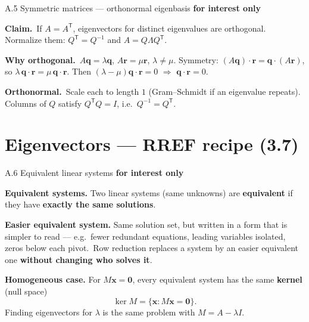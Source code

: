 \documentclass[11pt,aspectratio=169]{beamer}
\newcommand{\InterestOnly}{\textcolor{mAccent}{\textbf{for interest only}}}
\begin{document}
\begin{frame}{A.5 Symmetric matrices --- orthonormal eigenbasis}
  \footnotesize
  \InterestOnly

  \medskip
  \textbf{Claim.}\
  If $A=A^{\mathsf T}$, eigenvectors for distinct eigenvalues are orthogonal.
  Normalize them: $Q^{\mathsf T}=Q^{-1}$ and $A=Q\Lambda Q^{\mathsf T}$.

  \medskip
  \textbf{Why orthogonal.}\
  $A\mathbf{q}=\lambda\mathbf{q}$, $A\mathbf{r}=\mu\mathbf{r}$, $\lambda\neq\mu$.
  Symmetry: $(A\mathbf{q})\cdot\mathbf{r}=\mathbf{q}\cdot(A\mathbf{r})$, so
  $\lambda\,\mathbf{q}\cdot\mathbf{r}=\mu\,\mathbf{q}\cdot\mathbf{r}$.
  Then $(\lambda-\mu)\mathbf{q}\cdot\mathbf{r}=0$ $\Rightarrow$ $\mathbf{q}\cdot\mathbf{r}=0$.

  \medskip
  \textbf{Orthonormal.}\
  Scale each to length $1$ (Gram--Schmidt if an eigenvalue repeats).
  Columns of $Q$ satisfy $Q^{\mathsf T}Q=I$, i.e.\ $Q^{-1}=Q^{\mathsf T}$.
\end{frame}

\section{Eigenvectors --- RREF recipe (3.7)}

\begin{frame}{A.6 Equivalent linear systems}
  \hypertarget{sec:rref-eigenvectors}{}
  \footnotesize
  \InterestOnly

  \medskip
  \textbf{Equivalent systems.} Two linear systems (same unknowns) are \textbf{equivalent} if they have \textbf{exactly the same solutions}.

  \medskip
  \textbf{Easier equivalent system.} Same solution set, but written in a form that is simpler to read --- e.g.\ fewer redundant equations, leading variables isolated, zeros below each pivot.\
  Row reduction replaces a system by an easier equivalent one \textbf{without changing who solves it}.

  \medskip
  \textbf{Homogeneous case.} For $M\mathbf{x}=\mathbf{0}$, every equivalent system has the same \textbf{kernel} (null space)
  \[
    \ker M=\{\mathbf{x}:M\mathbf{x}=\mathbf{0}\}.
  \]
  Finding eigenvectors for $\lambda$ is the same problem with $M=A-\lambda I$.
\end{frame}
\end{document}
